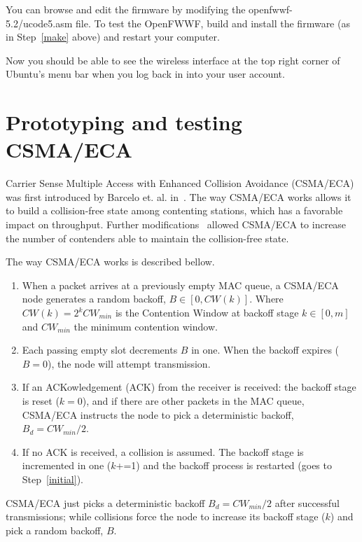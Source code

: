 \documentclass[conference]{IEEEtran}
\begin{document}
You can browse and edit the firmware by modifying the openfwwf-5.2/ucode5.asm file. To test the OpenFWWF, build and install the firmware (as in Step~\ref{make} above) and restart your computer.

Now you should be able to see the wireless interface at the top right corner of Ubuntu's menu bar when you log back in into your user account.

\section{Prototyping and testing CSMA/ECA}
Carrier Sense Multiple Access with Enhanced Collision Avoidance (CSMA/ECA) was first introduced by Barcelo et. al. in~\cite{barcelo2008lba}. The way CSMA/ECA works allows it to build a collision-free state among contenting stations, which has a favorable impact on throughput. Further modifications~\cite{research2standards} allowed CSMA/ECA to increase the number of contenders able to maintain the collision-free state.

The way CSMA/ECA works is described bellow.

\begin{enumerate}
	\item When a packet arrives at a previously empty MAC queue, a CSMA/ECA node generates a random backoff, $B\in[0,CW(k)]$. Where $CW(k)=2^{k}CW_{min}$ is the Contention Window at backoff stage $k\in[0,m]$ and $CW_{min}$ the minimum contention window.\label{initial}
 	\item Each passing empty slot decrements $B$ in one. When the backoff expires ($B=0$), the node will attempt transmission.
 	\item If an ACKowledgement (ACK) from the receiver is received: the backoff stage is reset ($k=0$), and if there are other packets in the MAC queue, CSMA/ECA instructs the node to pick a deterministic backoff, $B_{d}=CW_{min}/2$.\label{reset}
 	\item If no ACK is received, a collision is assumed. The backoff stage is incremented in one ($k$+=1) and the backoff process is restarted (goes to Step~\ref{initial}).
\end{enumerate}

CSMA/ECA just picks a deterministic backoff $B_{d}=CW_{min}/2$ after successful transmissions; while collisions force the node to increase its backoff stage ($k$) and pick a random backoff, $B$. 
\end{document}
